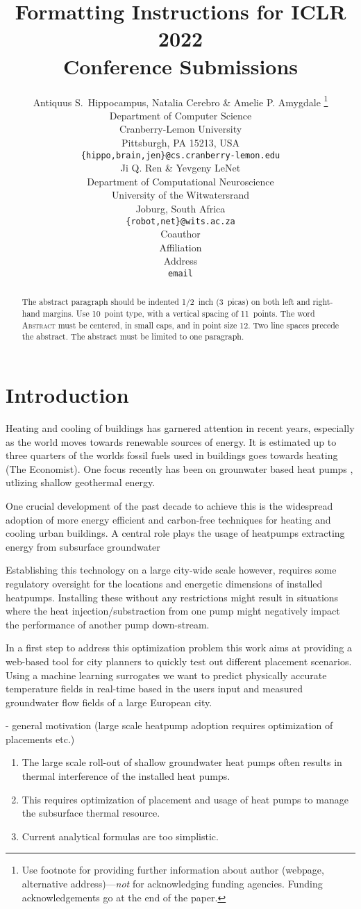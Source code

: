 \documentclass{article} %
\title{Formatting Instructions for ICLR 2022 \\ Conference Submissions}
\author{Antiquus S.~Hippocampus, Natalia Cerebro \& Amelie P. Amygdale \thanks{ Use footnote for providing further information
about author (webpage, alternative address)---\emph{not} for acknowledging
funding agencies.  Funding acknowledgements go at the end of the paper.} \\
Department of Computer Science\\
Cranberry-Lemon University\\
Pittsburgh, PA 15213, USA \\
\texttt{\{hippo,brain,jen\}@cs.cranberry-lemon.edu} \\
\And
Ji Q. Ren \& Yevgeny LeNet \\
Department of Computational Neuroscience \\
University of the Witwatersrand \\
Joburg, South Africa \\
\texttt{\{robot,net\}@wits.ac.za} \\
\AND
Coauthor \\
Affiliation \\
Address \\
\texttt{email}
}
\begin{document}
\maketitle

\begin{abstract}
   The abstract paragraph should be indented 1/2~inch (3~picas) on both left and
   right-hand margins. Use 10~point type, with a vertical spacing of 11~points.
   The word \textsc{Abstract} must be centered, in small caps, and in point size 12. Two
   line spaces precede the abstract. The abstract must be limited to one
   paragraph.
\end{abstract}

\section{Introduction}
\label{sec:intro}

Heating and cooling of buildings has garnered attention in recent years, especially as the world moves towards renewable sources of energy. 
It is estimated up to three quarters of the worlds fossil fuels used in buildings goes towards heating (The Economist).
One focus recently has been on grounwater based heat pumps \cite{Halilovic2022}, utlizing shallow geothermal energy.

One crucial development of the past decade to achieve this is the widespread adoption of more energy efficient and carbon-free techniques for heating and cooling urban buildings.
A central role plays the usage of heatpumps extracting energy from subsurface groundwater 

Establishing this technology on a large city-wide scale however, requires some regulatory oversight for the locations and energetic dimensions of installed heatpumps.
Installing these without any restrictions might result in situations where the heat injection/substraction from one pump might negatively impact the performance of another pump down-stream.

In a first step to address this optimization problem this work aims at providing a web-based tool for city planners to quickly test out different placement scenarios.
Using a machine learning surrogates we want to predict physically accurate temperature fields in real-time based in the users input and measured groundwater flow fields of a large European city.

- general motivation (large scale heatpump adoption requires optimization of placements etc.)
\begin{enumerate}
\item The large scale roll-out of shallow groundwater heat pumps often results in thermal interference of the installed heat pumps.
\item This requires optimization of placement and usage of heat pumps to manage the subsurface thermal resource.
\item Current analytical formulas are too simplistic.
\end{enumerate}
\end{document}
